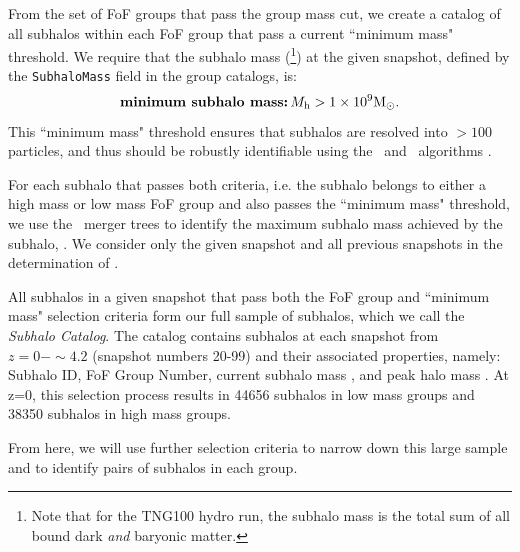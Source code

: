 \documentclass[twocolumn]{aastex631}
\newcommand{\subcat}{\textit{Subhalo Catalog}}
\begin{document}
    
    From the set of FoF groups that pass the group mass cut, we create a catalog of all subhalos within each FoF group that pass a current ``minimum mass" threshold.  
    We require that the subhalo mass (\Mhalo\footnote{Note that for the TNG100 hydro run, the subhalo mass is the total sum of all bound dark \textit{and} baryonic matter.}) at the given snapshot, defined by the \texttt{SubhaloMass} field in the group catalogs, is:
    \begin{equation*}
    \mbox{\textbf{minimum subhalo mass:}}\,
    \Mhalo > 1\times10^{9}\Msun.
    \end{equation*}
    This ``minimum mass" threshold ensures that subhalos are resolved into $>100$ particles, and thus should be robustly identifiable using the \subfind\ and \sublink\ algorithms \citep{RG2015}. 

    For each subhalo that passes both criteria, i.e. the subhalo belongs to either a high mass or low mass FoF group and also passes the ``minimum mass" threshold, we use the \sublink\ merger trees to identify the maximum subhalo mass achieved by the subhalo, \Mpeak. 
    We consider only the given snapshot and all previous snapshots in the determination of \Mpeak.

    All subhalos in a given snapshot that pass both the FoF group and ``minimum mass" selection criteria form our full sample of subhalos, which we call the \subcat. 
    The catalog contains subhalos at each snapshot from $z=0-\sim4.2$ (snapshot numbers 20-99) and their associated properties, namely: Subhalo ID, FoF Group Number, current subhalo mass \Mhalo, and peak halo mass \Mpeak. 
    At z=0, this selection process results in 44656 subhalos in low mass groups and 38350 subhalos in high mass groups.   
    
    From here, we will use further selection criteria to narrow down this large sample and to identify pairs of subhalos in each group.
\end{document}
